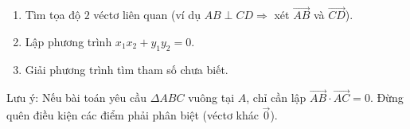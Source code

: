 \begin{enumerate}
\item Tìm tọa độ $2$ véctơ liên quan (ví dụ $AB \perp CD \Rightarrow$ xét $\overrightarrow{AB}$ và $\overrightarrow{CD}$).
\item Lập phương trình $x_1 x_2 + y_1 y_2 = 0$.
\item Giải phương trình tìm tham số chưa biết.
\end{enumerate}
Lưu ý: Nếu bài toán yêu cầu $\Delta ABC$ vuông tại $A$, chỉ cần lập $\overrightarrow{AB} \cdot \overrightarrow{AC} = 0$. Đừng quên điều kiện các điểm phải phân biệt (véctơ khác $\overrightarrow{0}$).

